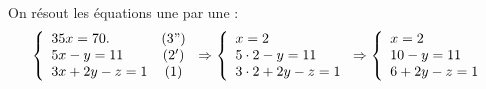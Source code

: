                               On r\'esout les \'equations une par une :
                              \[
                                    \left\lbrace
	                                    \begin{array}{lc}
	                                          35 x             =  70. & (3") \\
	                                           5 x -   y       =  11  & (2') \\
	                                           3 x + 2 y -   z =   1  & (1 )  \\
	                                    \end{array}
                                    \right.
                                    \Rightarrow
                                    \left\lbrace
	                                    \begin{array}{l}
	                                             x                   =   2    \\
	                                           5 \cdot 2 -   y       =  11    \\
	                                           3 \cdot 2 + 2 y -   z =   1    \\
	                                    \end{array}
                                    \right.
                                    \Rightarrow
                                    \left\lbrace
	                                    \begin{array}{l}
	                                             x           =  2  \\
	                                           10 -  y       =  11 \\
	                                           6 + 2 y -   z =   1 
	                                    \end{array}
                                    \right.
                              \]
